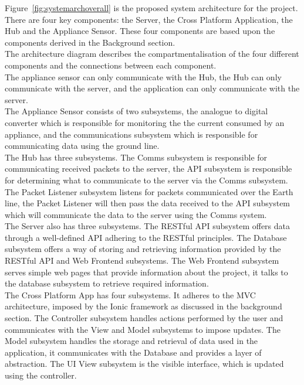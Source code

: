 \documentclass[draft,preprint,12pt,3p]{elsarticle}
\begin{document}
Figure~\ref{fig:systemarchoverall} is the proposed system architecture for the project.\\
There are four key components: the Server, the Cross Platform Application, the Hub and the Appliance Sensor. These four components are based upon the components derived in the Background section.\\
The architecture diagram describes the compartmentalisation of the four different components and the connections between each component.\\
The appliance sensor can only communicate with the Hub, the Hub can only communicate with the server, and the application can only communicate with the server.\\
The Appliance Sensor consists of two subsystems, the analogue to digital converter which is responsible for monitoring the the current consumed by an appliance, and the communications subsystem which is responsible for communicating data using the ground line.\\
The Hub has three subsystems. The Comms subsystem is responsible for communicating received packets to the server, the API subsystem is responsible for determining what to communicate to the server via the Comms subsystem. The Packet Listener subsystem listens for packets communicated over the Earth line, the Packet Listener will then pass the data received to the API subsystem which will communicate the data to the server using the Comms system.\\
The Server also has three subsystems. The RESTful API subsystem offers data through a well-defined API adhering to the RESTful principles. The Database subsystem offers a way of storing and retrieving information provided by the RESTful API and Web Frontend subsystems. The Web Frontend subsystem serves simple web pages that provide information about the project, it talks to the database subsystem to retrieve required information.\\
The Cross Platform App has four subsystems. It adheres to the MVC architecture, imposed by the Ionic framework as discussed in the background section. The Controller subsystem handles actions performed by the user and communicates with the View and Model subsystems to impose updates. The Model subsystem handles the storage and retrieval of data used in the application, it communicates with the Database and provides a layer of abstraction. The UI View subsystem is the visible interface, which is updated using the controller. 


\clearpage
\end{document}
